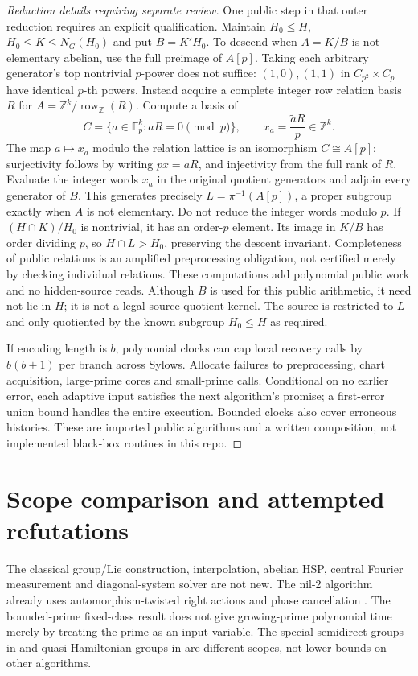 \documentclass[11pt]{article}
\theoremstyle{remark}
\begin{document}
\begin{proof}[Reduction details requiring separate review]
One public step in that outer reduction requires an explicit qualification.
Maintain $H_0\le H$, $H_0\le K\le N_G(H_0)$ and put $B=K'H_0$.
To descend when $A=K/B$ is not elementary abelian, use the full preimage
of $A[p]$. Taking each arbitrary generator's top nontrivial $p$-power
does not suffice: $(1,0),(1,1)$ in $C_{p^2}\times C_p$ have identical
$p$-th powers. Instead acquire a complete integer row relation basis $R$
for $A=\mathbb Z^k/\operatorname{row}_{\mathbb Z}(R)$. Compute a basis of
\[
 C=\{a\in\mathbb F_p^k:aR=0\pmod p\},
 \qquad x_a=\frac{\widetilde a R}{p}\in\mathbb Z^k.
\]
The map $a\mapsto x_a$ modulo the relation lattice is an isomorphism
$C\cong A[p]$: surjectivity follows by writing $px=aR$, and injectivity
from the full rank of $R$. Evaluate the integer words $x_a$ in the
original quotient generators and adjoin every generator of $B$. This
generates precisely $L=\pi^{-1}(A[p])$, a proper subgroup exactly when
$A$ is not elementary. Do not reduce the integer words modulo $p$.
If $(H\cap K)/H_0$ is nontrivial, it has an order-$p$ element. Its image
in $K/B$ has order dividing $p$, so $H\cap L>H_0$, preserving the descent
invariant. Completeness of public relations is an amplified preprocessing
obligation, not certified merely by checking individual relations. These
computations add polynomial public work and no hidden-source reads.
Although $B$ is used for this public arithmetic, it need not lie in $H$;
it is not a legal source-quotient kernel. The source is restricted to $L$
and only quotiented by the known subgroup $H_0\le H$ as required.

If encoding length is $b$, polynomial clocks can cap local recovery calls
by $b(b+1)$ per branch across Sylows. Allocate failures to preprocessing,
chart acquisition, large-prime cores and small-prime calls. Conditional on
no earlier error, each adaptive input satisfies the next algorithm's
promise; a first-error union bound handles the entire execution. Bounded
clocks also cover erroneous histories. These are imported public algorithms
and a written composition, not implemented black-box routines in this repo.
\end{proof}

\section{Scope comparison and attempted refutations}
The classical group/Lie construction, interpolation, abelian HSP,
central Fourier measurement and diagonal-system solver are not new.
The nil-2 algorithm already uses automorphism-twisted right actions and
phase cancellation \cite{iss}. The bounded-prime fixed-class result
\cite{ii} does not give growing-prime polynomial time merely by treating
the prime as an input variable. The special semidirect groups in
\cite{is,morales} and quasi-Hamiltonian groups in \cite{morales} are
different scopes, not lower bounds on other algorithms.
\end{document}
